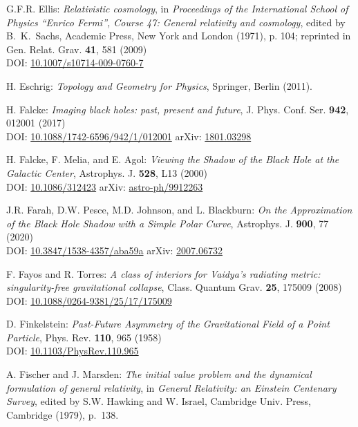 \begin{thebibliography}{123}
G.F.R. Ellis:
{\em Relativistic cosmology},
in  {\em Proceedings of the International School of Physics ``Enrico Fermi'',
Course 47: General relativity and cosmology}, edited by B.~K.~Sachs,
Academic Press, New York and London (1971), p. 104;
reprinted in Gen. Relat. Grav. {\bf 41}, 581 (2009)\\
DOI: \href{https://doi.org/10.1007/s10714-009-0760-7}{10.1007/s10714-009-0760-7}

H. Eschrig: {\em Topology and Geometry for Physics},
Springer, Berlin (2011).

H. Falcke:
{\em Imaging black holes: past, present and future},
J. Phys. Conf. Ser. {\bf 942}, 012001 (2017)\\
DOI: \href{https://doi.org/10.1088/1742-6596/942/1/012001}{10.1088/1742-6596/942/1/012001}\hfill
arXiv: \href{https://arxiv.org/abs/1801.03298}{1801.03298}

H. Falcke, F. Melia, and E. Agol:
{\em Viewing the Shadow of the Black Hole at the Galactic Center},
Astrophys. J. {\bf 528}, L13 (2000)\\
DOI: \href{https://doi.org/10.1086/312423}{10.1086/312423}\hfill
arXiv: \href{https://arxiv.org/abs/astro-ph/9912263}{astro-ph/9912263}

J.R. Farah, D.W. Pesce, M.D. Johnson, and L. Blackburn:
{\em On the Approximation of the Black Hole Shadow with a Simple Polar Curve},
Astrophys. J. {\bf 900}, 77 (2020)\\
DOI: \href{https://doi.org/10.3847/1538-4357/aba59a}{10.3847/1538-4357/aba59a}\hfill
arXiv: \href{https://arxiv.org/abs/2007.06732}{2007.06732}

F. Fayos and R. Torres:
{\em A class of interiors for Vaidya's radiating metric: singularity-free gravitational collapse},
Class. Quantum Grav. {\bf 25}, 175009 (2008)\\
DOI: \href{https://doi.org/10.1088/0264-9381/25/17/175009}{10.1088/0264-9381/25/17/175009}

D. Finkelstein:
{\em Past-Future Asymmetry of the Gravitational Field of a Point Particle},
Phys. Rev. {\bf 110}, 965 (1958)\\
DOI: \href{https://doi.org/10.1103/PhysRev.110.965}{10.1103/PhysRev.110.965}

A. Fischer and J. Marsden:
{\em The initial value problem and the dynamical formulation of general relativity},
in {\em General Relativity: an Einstein
Centenary Survey}, edited by S.W. Hawking and W. Israel,
Cambridge Univ. Press, Cambridge (1979), p.~138.


\end{thebibliography}

